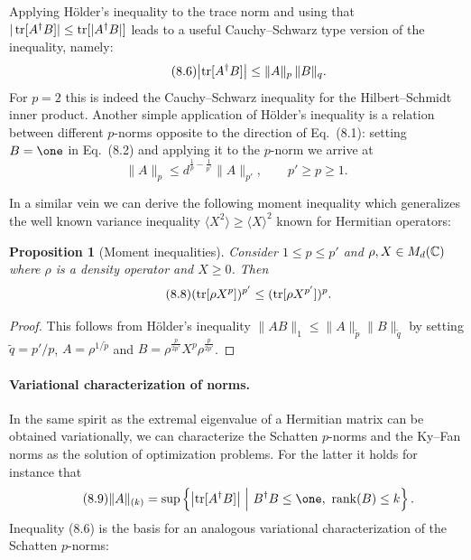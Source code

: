 \documentclass[11pt,a4paper]{article}
\theoremstyle{plain}
\newtheorem{proposition}{Proposition}[section]
\theoremstyle{definition}
\theoremstyle{remark}
\begin{document}
Applying H\"older's inequality to the trace norm and using that $|\operatorname{tr}[A^\dagger B]|\le \operatorname{tr}[|A^\dagger B|]$
leads to a useful Cauchy--Schwarz type version of the inequality, namely:
\begin{equation}\tag{8.6}
    \bigl|\operatorname{tr}[A^\dagger B]\bigr| \le \|A\|_p\,\|B\|_q.
\end{equation}
For $p=2$ this is indeed the Cauchy--Schwarz inequality for the Hilbert--Schmidt inner product. Another simple application of H\"older's inequality is a relation
between different $p$-norms opposite to the direction of Eq.~(8.1): setting $B=\one$ in Eq.~(8.2) and applying it to the $p$-norm we arrive at
\begin{equation}\tag{8.7}
    \|A\|_p \le d^{\frac{1}{p}-\frac{1}{p'}} \|A\|_{p'},\qquad p'\ge p\ge 1.
\end{equation}

In a similar vein we can derive the following moment inequality which generalizes the well known variance inequality $\langle X^2\rangle \ge \langle X\rangle^2$
known for Hermitian operators:

\begin{proposition}[Moment inequalities]
    Consider $1\le p\le p'$ and $\rho,X\in M_d(\mathbb{C})$ where $\rho$ is a density operator and $X\ge 0$. Then
    \begin{equation}\tag{8.8}
        (\operatorname{tr}[\rho X^p])^{p'} \le (\operatorname{tr}[\rho X^{p'}])^p.
    \end{equation}
\end{proposition}

\begin{proof}
    This follows from H\"older's inequality $\|AB\|_1 \le \|A\|_{\tilde p}\|B\|_{\tilde q}$ by setting
    $\tilde q = p'/p$, $A=\rho^{1/\tilde p}$ and $B=\rho^{\frac{p}{2p'}}X^p\rho^{\frac{p}{2p'}}$.
\end{proof}

\paragraph{Variational characterization of norms.}
In the same spirit as the extremal eigenvalue of a Hermitian matrix can be obtained variationally, we can characterize
the Schatten $p$-norms and the Ky--Fan norms as the solution of optimization problems. For the latter it holds for instance that
\begin{equation}\tag{8.9}
    \|A\|_{(k)}=\sup\left\{\bigl|\tr[A^\dagger B]\bigr|\ \Big|\ B^\dagger B\le \one,\ \rank(B)\le k\right\}.
\end{equation}
Inequality (8.6) is the basis for an analogous variational characterization of the Schatten $p$-norms:
\end{document}
